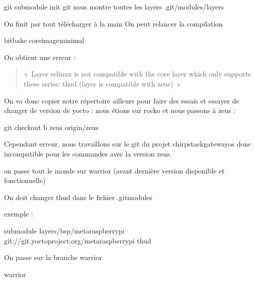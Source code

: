 \documentclass[letterpaper,10pt,french]{sphinxmanual}
\begin{document}
\begin{sphinxVerbatim}[commandchars=\\\{\}]
git submodule init
git  \PYGZgt{} nous montre toutes les layers .git/modules/layers
\end{sphinxVerbatim}

On finit par tout télécharger à la main
On peut relancer la compilation

\begin{sphinxVerbatim}[commandchars=\\\{\}]
bitbake core\PYGZhy{}image\PYGZhy{}minimal
\end{sphinxVerbatim}

On obtient une erreur :
\begin{quote}

« Layer selinux is not compatible with the core layer which only supports these series: thud (layer is compatible with zeus) »
\end{quote}

On va donc copier notre répertoire ailleurs pour faire des essais et essayer de changer de version de yocto : nous étions sur rocko et nous passons à zeus :

\begin{sphinxVerbatim}[commandchars=\\\{\}]
git checkout \PYGZhy{}b zeus origin/zeus
\end{sphinxVerbatim}

Cependant erreur, nous travaillons sur le git du projet chirpstack\sphinxhyphen{}gateway\sphinxhyphen{}os donc incompatible pour les commandes avec la version zeus.

on passe tout le monde sur warrior (avant dernière version disponible et fonctionnelle)

On doit changer thud dans le fichier .gitmodules

exemple :

\begin{sphinxVerbatim}[commandchars=\\\{\}]
\PYG{o}{[}submodule \PYG{o}{]}
      layers/bsp/meta\PYGZhy{}raspberrypi
      git://git.yoctoproject.org/meta\PYGZhy{}raspberrypi
      thud
\end{sphinxVerbatim}

On passe sur la branche warrior

\begin{sphinxVerbatim}[commandchars=\\\{\}]
  warrior
\end{sphinxVerbatim}
\end{document}
